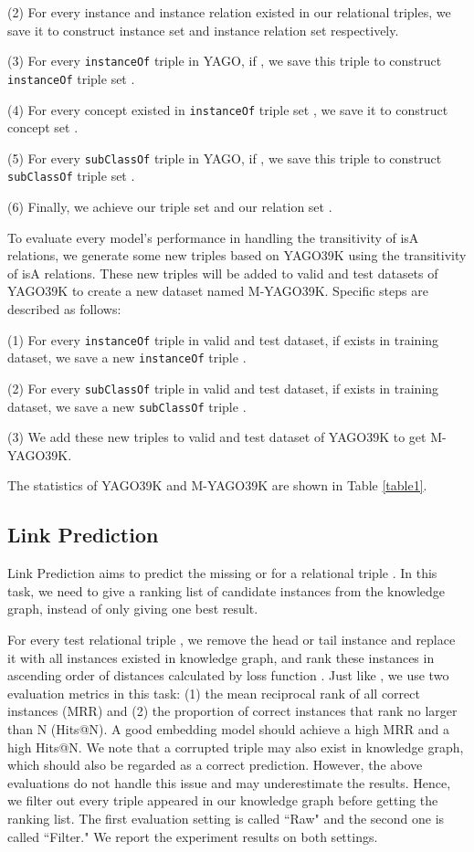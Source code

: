 \documentclass[11pt,a4paper]{article}
\begin{document}
  (2) For every instance and instance relation existed in our relational triples, we save it to construct 
  instance set  and instance relation set  respectively.
  
  (3) For every \texttt{instanceOf} triple  in YAGO, if , we save this triple 
  to construct \texttt{instanceOf} triple set .
  
  (4) For every concept existed in \texttt{instanceOf} triple set , we save it to construct 
  concept set . 
  
  (5) For every \texttt{subClassOf} triple  in YAGO, if , 
  we save this triple to construct \texttt{subClassOf} triple set .
  
  (6) Finally, we achieve our triple set 
  and our relation set .
  
  To evaluate every model's performance in handling the transitivity of isA relations, we generate some new triples
  based on YAGO39K using the transitivity of isA relations. These new triples will be added to
  valid and test datasets of YAGO39K to create a new dataset named M-YAGO39K. Specific steps are described as follows:
  
  (1) For every \texttt{instanceOf} triple  in valid and test dataset, if  exists in training dataset, 
  we save a new \texttt{instanceOf} triple .
  
  (2) For every \texttt{subClassOf} triple  in valid and test dataset, if  exists in training dataset, 
  we save a new \texttt{subClassOf} triple .
  
  (3) We add these new triples to valid and test dataset of YAGO39K to get M-YAGO39K.
  
  The statistics of YAGO39K and M-YAGO39K are shown in Table \ref{table1}.
  
  
  \subsection{Link Prediction}
  
  Link Prediction aims to predict the missing  or  for a relational triple . In this task, we need to
  give a ranking list of candidate instances from the knowledge graph, instead of only giving one best result.
  
  For every test relational triple , we remove the head or tail instance and replace it
  with all instances existed in knowledge graph, and rank these instances in ascending order of distances calculated by 
  loss function . Just like \cite{TransE}, we use two evaluation metrics in this task: (1) the mean reciprocal rank
  of all correct instances (MRR) and (2) the proportion of correct instances that rank no larger than N (Hits@N).
  A good embedding model should achieve a high MRR and a high Hits@N. We note that a corrupted triple may 
  also exist in knowledge graph, which should also be regarded as a correct prediction. However, the above evaluations 
  do not handle this issue and may underestimate the results. Hence, we filter out every triple appeared in our knowledge
  graph before getting the ranking list. The first evaluation setting is called ``Raw" and the second one is called ``Filter."
  We report the experiment results on both settings.
  
\end{document}
